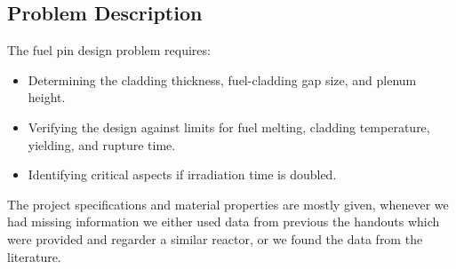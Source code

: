 \subsection{Problem Description}
The fuel pin design problem requires:

\begin{itemize}
\item Determining the cladding thickness, fuel-cladding gap size, and plenum height.
\item Verifying the design against limits for fuel melting, cladding temperature, yielding, and rupture time.
\item Identifying critical aspects if irradiation time is doubled.
\end{itemize}

The project specifications and material properties are mostly given, 
whenever we had missing information we either used data from previous the handouts which were provided and regarder a similar reactor,
or we found the data from the literature.
